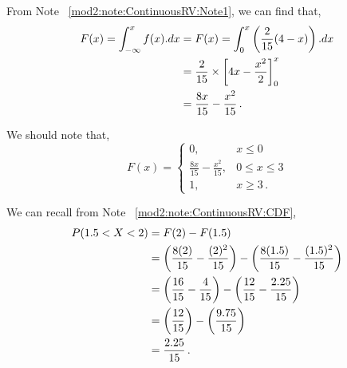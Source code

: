 \begin{subquestions}
\begin{subsubquestions}
From Note ~\ref{mod2:note:ContinuousRV:Note1}, we can find that,
\begin{align}
	F(x) = \int_{-\infty}^{x} f(x).dx & = F(x) = \int_{0}^{x}\left( \frac{2}{15}(4-x)\right).dx \nonumber \\
	                                  & = \frac{2}{15} \times \left[4x - \frac{x^2}{2} \right]^x_0 \nonumber \\
	                                  & = \frac{8x}{15} - \frac{x^2}{15} \,.
\end{align}

We should note that,
\[ F(x) =
\begin{cases} 
	0, & x \leq 0 \\
	\frac{8x}{15} - \frac{x^2}{15}, & 0 \leq x \leq 3 \\
	1, & x \geq 3 \,.
\end{cases}
\]


\subsubquestion

We can recall from Note ~\ref{mod2:note:ContinuousRV:CDF}, 
\begin{align}
		P( 1.5 < X < 2) & = F(2) - F(1.5) \nonumber \\
		                & = \left(\frac{8(2)}{15} - \frac{(2)^2}{15}\right) - \left(\frac{8(1.5)}{15} - \frac{(1.5)^2}{15}\right) \nonumber \\
		                & = \left(\frac{16}{15} - \frac{4}{15}\right) - \left(\frac{12}{15} - \frac{2.25}{15}\right) \nonumber \\
		                & = \left(\frac{12}{15}\right) - \left(\frac{9.75}{15} \right) \nonumber \\
		                & = \frac{2.25}{15} \,.
\end{align}

\end{subsubquestions}
	
	
\end{subquestions}

